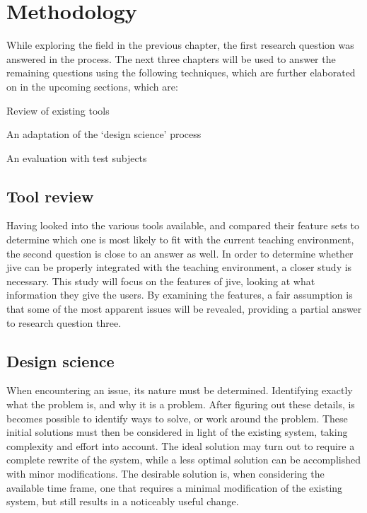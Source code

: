 \chapter{Methodology}\label{methodology}

While exploring the field in the previous chapter, the first research question was answered in the process.
The next three chapters will be used to answer the remaining questions using the following techniques, which are further elaborated on in the upcoming sections, which are:

\begin{itemize*}
	\item{Review of existing tools}
	\item{An adaptation of the `design science' process}%
	\item{An evaluation with test subjects}
\end{itemize*}

\section{Tool review}\label{methReview}

Having looked into the various tools available, and compared their feature sets to determine which one is most likely to fit with the current teaching environment, the second question is close to an answer as well.
In order to determine whether \gls{jive} can be properly integrated with the teaching environment, a closer study is necessary.
This study will focus on the features of \gls{jive}, looking at what information they give the users.
By examining the features, a fair assumption is that some of the most apparent issues will be revealed, providing a partial answer to research question three.

\section{Design science}\label{methDesign}


When encountering an issue, its nature must be determined.
Identifying exactly what the problem is, and why it is a problem.
After figuring out these details, is becomes possible to identify ways to solve, or work around the problem.
These initial solutions must then be considered in light of the existing system, taking complexity and effort into account.
The ideal solution may turn out to require a complete rewrite of the system, while a less optimal solution can be accomplished with minor modifications.
The desirable solution is, when considering the available time frame, one that requires a minimal modification of the existing system, but still results in a noticeably useful change.

